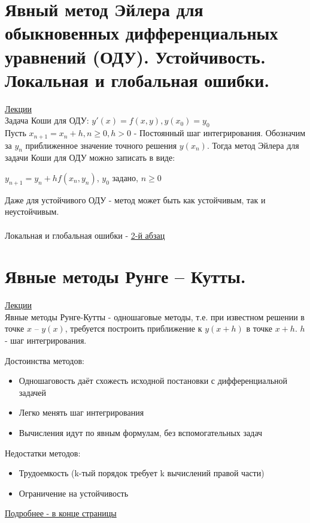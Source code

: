 \documentclass[specialist, subf, href, colorlinks=true, 12pt, times, mtpro, final]{disser}
\theoremstyle{definition}
\begin{document}
	

\section {Явный метод Эйлера для обыкновенных дифференциальных уравнений (ОДУ). Устойчивость. Локальная и глобальная ошибки.}
	\hyperlink {lects.87}{Лекции}\\
	Задача Коши для ОДУ: 
	$y'(x)=f(x,y), y(x_0) = y_0$\\
	
	Пусть $x_{n+1} = x_n + h, n \geq 0, h > 0$ - Постоянный шаг интегрирования. Обозначим за $y_n$ приближенное значение точного решения $y(x_n)$. Тогда метод Эйлера для задачи Коши для ОДУ можно записать в виде:\\
	\begin{center}
	$y_{n+1} = y_n + h f(x_n, y_n)$, $y_0$ задано, $n \geq 0$
	\end{center}

Даже для устойчивого ОДУ -  метод может быть как устойчивым, так и неустойчивым.\\
\\
Локальная и глобальная ошибки - \hyperlink {lects.88}{2-й абзац}


\section {Явные методы Рунге -- Кутты.}
	\hyperlink {lects.89}{Лекции}\\
	
	Явные методы Рунге-Кутты - одношаговые методы, т.е. при известном решении в точке $x$ \--- $y(x)$, требуется построить приближение к $y(x+h)$ в точке $x+h$. $h$ - шаг интегрирования.
	
	Достоинства методов:
	\begin{itemize}
	\item Одношаговость даёт схожесть исходной постановки с дифференциальной задачей
	\item Легко менять шаг интегрирования
	\item Вычисления идут по явным формулам, без вспомогательных задач
	\end{itemize}
	Недостатки методов:
	\begin{itemize}
	\item Трудоемкость (k-тый порядок требует k вычислений правой части)
	\item Ограничение на устойчивость 
	\end{itemize}
	\hyperlink {lects.90}{Подробнее - в конце страницы}\\
\end{document}
